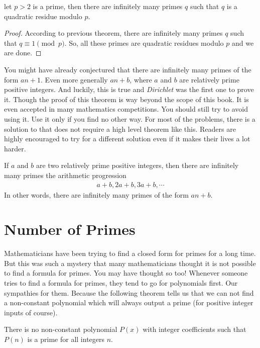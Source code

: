 	\begin{theorem}
		let $p>2$ is a prime, then there are infinitely many primes $q$ such that $q$ is a quadratic residue modulo $p$.
	\end{theorem}

	\begin{proof}
		According to previous theorem, there are infinitely many primes $q$ such that $q \equiv 1 \pmod p$. So, all these primes are quadratic residues modulo $p$ and we are done.
	\end{proof}
You might have already conjectured that there are infinitely many primes of the form $an+1$. Even more generally $an+b$, where $a$ and $b$ are relatively prime positive integers. And luckily, this is true and \textit{Dirichlet} was the first one to prove it. Though the proof of this theorem is way beyond the scope of this book. It is even accepted in many mathematics competitions. You should still try to avoid using it. Use it only if you find no other way. For most of the problems, there is a solution to that does not require a high level theorem like this. Readers are highly encouraged to try for a different solution even if it makes their  lives a lot harder.
	\begin{theorem}
		If $a$ and $b$ are two relatively prime positive integers, then there are infinitely many primes the arithmetic progression
			\begin{align*}
				a+b, 2a+b, 3a+b, \cdots
			\end{align*}
		In other words, there are infinitely many primes of the form $an+b$.
	\end{theorem}
\section{Number of Primes}
	Mathematicians have been trying to find a closed form for primes for a long time. But this was such a mystery that many mathematicians thought it is not possible to find a formula for primes. You may have thought so too! Whenever someone tries to find a formula for primes, they tend to go for polynomials first. Our sympathies for them. Because the following theorem tells us that we can not find a non-constant polynomial which will always output a prime (for positive integer inputs of course).
		\begin{theorem}
			There is no non-constant polynomial $P(x)$ with integer coefficients such that $P(n)$ is a prime for all integers $n$.
		\end{theorem}

